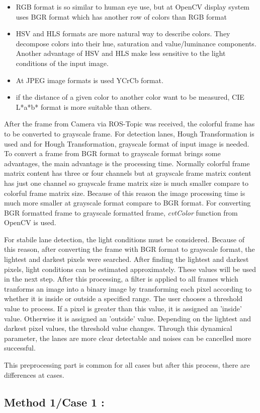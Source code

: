 \begin{itemize}

\item RGB format is so similar to human eye use, but at OpenCV display system uses BGR format which has another row of colors than RGB format  

\item HSV and HLS formats are more natural way to describe colors. They decompose colors into their hue, saturation and value/luminance components. Another advantage of HSV and HLS make less sensitive to the light conditions of the input image.

\item At JPEG image formats is used YCrCb format.

\item if the distance of a given color to another color want to be measured, CIE L*a*b* format is more suitable than others.

\end{itemize}

After the frame from Camera via ROS-Topic was received, the colorful frame has to be converted to grayscale frame. For detection lanes, Hough Transformation is used and for Hough Transformation, grayscale format of input image is needed. To convert a frame from BGR format to grayscale format brings some advantages, the main advantage is the processing time. Normally colorful frame matrix content has three or four channels but at grayscale frame matrix content has just one channel so grayscale frame matrix size is much smaller compare to colorful frame matrix size. Because of this reason the image processing time is much more smaller at grayscale format compare to BGR format. For converting BGR formatted frame to grayscale formatted frame, \textit{cvtColor} function from OpenCV is used.

 For stabile lane detection, the light conditions must be considered. Because of this reason, after converting the frame with BGR format to grayscale format, the lightest and darkest pixels were searched. After finding the lightest and darkest pixels, light conditions can be estimated approximately. These values will be used in the next step. After this processing, a filter is applied to all frames which tranforms an image into a binary image by transforming each pixel according to whether it is inside or outside a specified range. The user chooses a threshold value to process. If a pixel is greater than this value, it is assigned an 'inside' value. Otherwise it is assigned an 'outside' value. Depending on the lightest and darkest pixel values, the threshold value changes. Through this dynamical parameter, the lanes are more clear detectable and noises can be cancelled more successful.
 
 This preprocessing part is common for all cases but after this process, there are differences at cases.
 

%
\subsection{Method 1/Case 1 :}\label{sec:Method 1}






 
%


